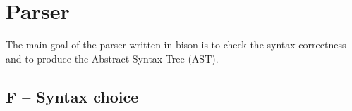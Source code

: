 \section{Parser}
\label{sec:parser}
The main goal of the parser written in bison is to check the
syntax correctness and to produce the Abstract Syntax Tree (AST). 

\subsection{F -- Syntax choice}

